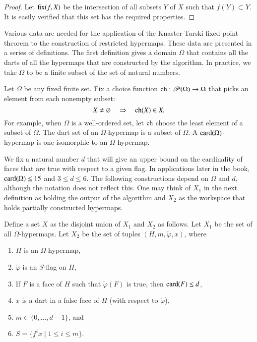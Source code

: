 \begin{proof} Let ${\operatorname{fix}}(f,X)$ be the intersection of all subsets
$Y$ of $X$ such that $f(Y)\subset Y$.  It is easily verified that
this set has the required properties.
\end{proof}

Various data are needed for the application of the Knaster-Tarski
fixed-point theorem to the construction of restricted hypermaps.  These
data are presented in a series of definitions.  The first definition
gives a domain $\Omega$ that  contains all the darts of all the
hypermaps that are constructed by the algorithm.  In practice, we
take $\Omega$ to be a finite subset of the set of natural numbers.

\begin{definition}[$\Omega$,~$\op{ch}$]
  Let $\Omega$ be any fixed finite set.  Fix a choice function
  ${\operatorname{ch}}:{\mathscr P}(\Omega)\to \Omega$ that picks an element from
  each nonempty subset:
\[ 
X\ne\varnothing\quad  \Rightarrow \quad  {\operatorname{ch}}(X)\in X.
\] 
For example, when
$\Omega$ is a well-ordered set, let $\op{ch}$ choose the least element of a subset
of $\Omega$.  The dart set of an $\Omega$-hypermap is a
subset of $\Omega$.
A
${\operatorname{card}}(\Omega)$-hypermap is one isomorphic to an $\Omega$-hypermap.
\end{definition}
%
%
%


We fix a natural number $d$ that will give an upper bound on the
cardinality of faces that are true with respect to a given flag.
In applications later in the book, ${\operatorname{card}}(\Omega)\le15$ and $3\le d\le 6$.
The following constructions depend on $\Omega$ and $d$, although the
notation does not reflect this.  One may think of $X_1$ in the next
definition as holding the output of the algorithm and $X_2$ as the
workspace that holds partially constructed hypermaps.

\begin{definition}[$X$,~$X_1$,~$X_2$]
Define a set $X$ as the disjoint union of $X_1$ and $X_2$ as follows.
Let $X_1$ be the set of all $\Omega$-hypermaps.
Let $X_2$ be the set of tuples $(H,m,\check\varphi,x)$, where 
\begin{enumerate}\wasitemize 
\item $H$ is an $\Omega$-hypermap,
\item $\check\varphi$ is an $S$-flag on $H$,
\item If $F$ is a face of $H$ such that $\check\varphi(F)$ is true,
then ${\operatorname{card}}(F)\le d$,
\item  $x$ is a dart in a false face of $H$ (with respect to $\check\varphi$),
\item $m\in\{0,\ldots,d-1\}$, 
and
\item $S = \{f^i x\mid 1 \le i \le m\}$.
\end{enumerate}\wasitemize 
\end{definition}


